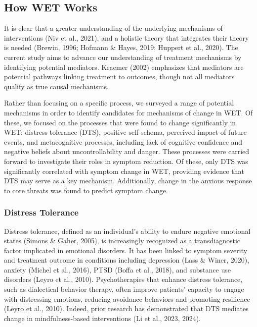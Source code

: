 \documentclass[
  man,floatsintext]{apa7}
\begin{document}
\subsection{How WET Works}\label{how-wet-works}

It is clear that a greater understanding of the underlying mechanisms of interventions (Niv et al., 2021), and a holistic theory that integrates their theory is needed (Brewin, 1996; Hofmann \& Hayes, 2019; Huppert et al., 2020).
The current study aims to advance our understanding of treatment mechanisms by identifying potential mediators.
Kraemer (2002) emphasizes that mediators are potential pathways linking treatment to outcomes, though not all mediators qualify as true causal mechanisms.

Rather than focusing on a specific process, we surveyed a range of potential mechanisms in order to identify candidates for mechanisms of change in WET.
Of these, we focused on the processes that were found to change significantly in WET: distress tolerance (DTS), positive self-schema, perceived impact of future events, and metacognitive processes, including lack of cognitive confidence and negative beliefs about uncontrollability and danger.
These processes were carried forward to investigate their roles in symptom reduction.
Of these, only DTS was significantly correlated with symptom change in WET, providing evidence that DTS may serve as a key mechanism.
Additionally, change in the anxious response to core threats was found to predict symptom change.

\subsubsection{Distress Tolerance}\label{distress-tolerance}

Distress tolerance, defined as an individual's ability to endure negative emotional states (Simons \& Gaher, 2005), is increasingly recognized as a transdiagnostic factor implicated in emotional disorders.
It has been linked to symptom severity and treatment outcome in conditions including depression (Lass \& Winer, 2020), anxiety (Michel et al., 2016), PTSD (Boffa et al., 2018), and substance use disorders (Leyro et al., 2010).
Psychotherapies that enhance distress tolerance, such as dialectical behavior therapy, often improve patients' capacity to engage with distressing emotions, reducing avoidance behaviors and promoting resilience (Leyro et al., 2010).
Indeed, prior research has demonstrated that DTS mediates change in mindfulness-based interventions (Li et al., 2023, 2024).
\end{document}
